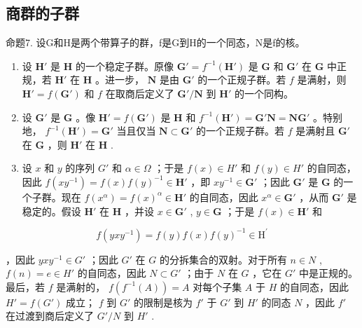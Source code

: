 \subsection{商群的子群}

命题7. 设G和H是两个带算子的群，f是G到H的一个同态，N是f的核。

\begin{enumerate}
\def\labelenumi{(\alph{enumi})}
\item
  设 \(\mathbf{H}'\) 是 \(\mathbf{H}\) 的一个稳定子群。原像 \(\mathbf{G}' = f^{-1}(\mathbf{H}')\) 是 \(\mathbf{G}\) 和 \(\mathbf{G}'\) 在 \(\mathbf{G}\) 中正规，若 \(\mathbf{H}'\) 在 \(\mathbf{H}\) 。进一步， \(\mathbf{N}\) 是由 \(\mathbf{G}'\) 的一个正规子群。若 \(f\) 是满射，则 \(\mathbf{H}' = f(\mathbf{G}')\) 和 \(f\) 在取商后定义了 \(\mathbf{G}' / \mathbf{N}\) 到 \(\mathbf{H}'\) 的一个同构。
\item
  设 \(\mathbf{G}'\) 是 \(\mathbf{G}\) 。像 \(\mathbf{H}' = f(\mathbf{G}')\) 是 \(\mathbf{H}\) 和 \(f^{-1}(\mathbf{H}') = \mathbf{G}'\mathbf{N} = \mathbf{NG}'\) 。特别地， \(f^{-1}(\mathbf{H}') = \mathbf{G}'\) 当且仅当 \(\mathbf{N} \subset \mathbf{G}'\) 的一个正规子群。若 \(f\) 是满射且 \(\mathbf{G}'\) 在 \(\mathbf{G}\) ，则 \(\mathbf{H}'\) 在 \(\mathbf{H}\) .
\item
  设 \(x\) 和 \(y\) 的序列 \(G'\) 和 \(\alpha \in \Omega\) ；于是 \(f(x) \in H'\) 和 \(f(y) \in H'\) 的自同态，因此 \(f(xy^{-1}) = f(x)f(y)^{-1} \in \mathbf{H}'\) ，即 \(xy^{-1} \in \mathbf{G}'\) ；因此 \(\mathbf{G}'\) 是 \(\mathbf{G}\) 的一个子群。现在 \(f(x^{\alpha}) = f(x)^{\alpha} \in \mathbf{H}'\) 的自同态，因此 \(x^{\alpha} \in \mathbf{G}'\) ，从而 \(\mathbf{G}'\) 是稳定的。假设 \(\mathbf{H}'\) 在 \(\mathbf{H}\) ，并设 \(x \in \mathbf{G}'\) , \(y \in \mathbf{G}\) ；于是 \(f(x) \in \mathbf{H}'\) 和
\end{enumerate}

\[
f (y x y ^ {- 1}) = f (y) f (x) f (y) ^ {- 1} \in \mathrm{H} ^ {\prime}
\]

，因此 \(yxy^{-1} \in G'\) ；因此 \(G'\) 在 \(G\) 的分拆集合的双射。对于所有 \(n \in N\) , \(f(n) = e \in H'\) 的自同态，因此 \(N \subset G'\) ；由于 \(N\) 在 \(G\) ，它在 \(G'\) 中是正规的。最后，若 \(f\) 是满射的， \(f(f^{-1}(A)) = A\) 对每个子集 \(A\) 于 \(H\) 的自同态，因此 \(H' = f(G')\) 成立； \(f\) 到 \(G'\) 的限制是核为 \(f'\) 于 \(G'\) 到 \(H'\) 的同态 \(N\) ，因此 \(f'\) 在过渡到商后定义了 \(G'/N\) 到 \(H'\) .

